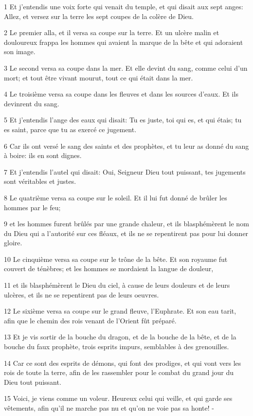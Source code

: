 \par 1 Et j'entendis une voix forte qui venait du temple, et qui disait aux sept anges: Allez, et versez sur la terre les sept coupes de la colère de Dieu.
\par 2 Le premier alla, et il versa sa coupe sur la terre. Et un ulcère malin et douloureux frappa les hommes qui avaient la marque de la bête et qui adoraient son image.
\par 3 Le second versa sa coupe dans la mer. Et elle devint du sang, comme celui d'un mort; et tout être vivant mourut, tout ce qui était dans la mer.
\par 4 Le troisième versa sa coupe dans les fleuves et dans les sources d'eaux. Et ils devinrent du sang.
\par 5 Et j'entendis l'ange des eaux qui disait: Tu es juste, toi qui es, et qui étais; tu es saint, parce que tu as exercé ce jugement.
\par 6 Car ils ont versé le sang des saints et des prophètes, et tu leur as donné du sang à boire: ils en sont dignes.
\par 7 Et j'entendis l'autel qui disait: Oui, Seigneur Dieu tout puissant, tes jugements sont véritables et justes.
\par 8 Le quatrième versa sa coupe sur le soleil. Et il lui fut donné de brûler les hommes par le feu;
\par 9 et les hommes furent brûlés par une grande chaleur, et ils blasphémèrent le nom du Dieu qui a l'autorité sur ces fléaux, et ils ne se repentirent pas pour lui donner gloire.
\par 10 Le cinquième versa sa coupe sur le trône de la bête. Et son royaume fut couvert de ténèbres; et les hommes se mordaient la langue de douleur,
\par 11 et ils blasphémèrent le Dieu du ciel, à cause de leurs douleurs et de leurs ulcères, et ils ne se repentirent pas de leurs oeuvres.
\par 12 Le sixième versa sa coupe sur le grand fleuve, l'Euphrate. Et son eau tarit, afin que le chemin des rois venant de l'Orient fût préparé.
\par 13 Et je vis sortir de la bouche du dragon, et de la bouche de la bête, et de la bouche du faux prophète, trois esprits impurs, semblables à des grenouilles.
\par 14 Car ce sont des esprits de démons, qui font des prodiges, et qui vont vers les rois de toute la terre, afin de les rassembler pour le combat du grand jour du Dieu tout puissant.
\par 15 Voici, je viens comme un voleur. Heureux celui qui veille, et qui garde ses vêtements, afin qu'il ne marche pas nu et qu'on ne voie pas sa honte! -
